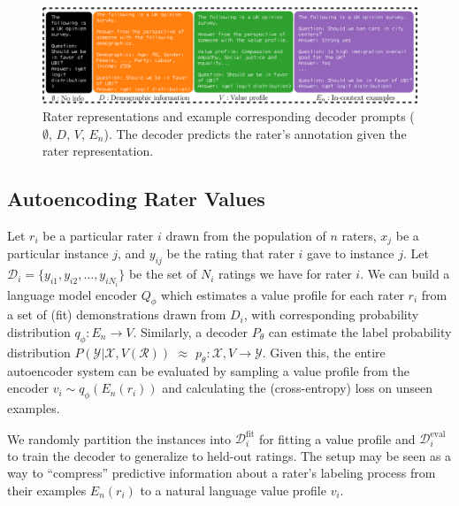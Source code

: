 \documentclass[11pt]{article}
\begin{document}
\begin{figure}[t]
\centering
\includegraphics[width=\textwidth]{files/raterreplarge-cropped.pdf}
\vspace{-5pt}
\caption{Rater representations and example corresponding decoder prompts
($\emptyset$, $D$, $V$, $E_n$).
The decoder predicts the rater's annotation given the rater representation.
}
\label{fig:raterrep}
\vspace{-2pt}
\end{figure}

\subsection{Autoencoding Rater Values}
\label{sec:autoencoder}

Let $r_i$ be a particular rater $i$ drawn from the population of $n$ raters, $x_j$ be a particular instance $j$, and $y_{ij}$ be the rating that rater $i$ gave to instance $j$. Let $\mathcal{D}_i = \{y_{i1}, y_{i2}, \ldots, y_{iN_i}\}$ be the set of $N_i$ ratings we have for rater $i$. We can build a language model encoder $Q_\phi$ which estimates a value profile for each rater $r_i$ from a set of (fit) demonstrations drawn from $D_i$, with corresponding probability distribution $q_\phi: E_n \to V$. Similarly, a decoder $P_\theta$ can estimate the label probability distribution $P(\mathcal{Y}|\mathcal{X},V(\mathcal{R}))$ $\approx$ $p_\theta: \mathcal{X}, V \to \mathcal{Y}$. Given this, the entire autoencoder system can be evaluated by sampling a value profile from the encoder $v_i \sim q_\phi(E_n(r_i))$ and calculating the (cross-entropy) loss on unseen examples.

We randomly partition the instances into $\mathcal{D}_i^{\text{fit}}$ for fitting a value profile and $\mathcal{D}_i^{\text{eval}}$
to train the decoder to generalize to held-out ratings. The setup may be seen as a way to ``compress'' predictive information about a rater's labeling process from their examples $E_n(r_i)$ to a natural language value profile $v_i$.
\end{document}
